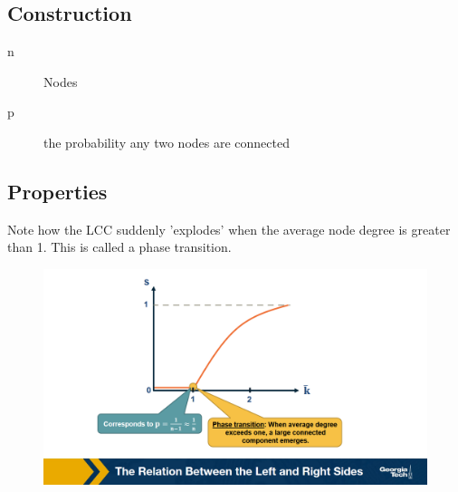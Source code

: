 \documentclass{article}
\begin{document}
\subsection{Construction}
\begin{description}
    \item [n] Nodes
    \item [p] the probability any two nodes are connected 
\end{description}

\subsection{Properties}
Note how the LCC suddenly 'explodes' when the average node degree is greater than 1. This is called a phase transition. 
\begin{figure}
    \centering
    \includegraphics[width=1\linewidth]{lcc-explosion.png}
\end{figure}
\end{document}
